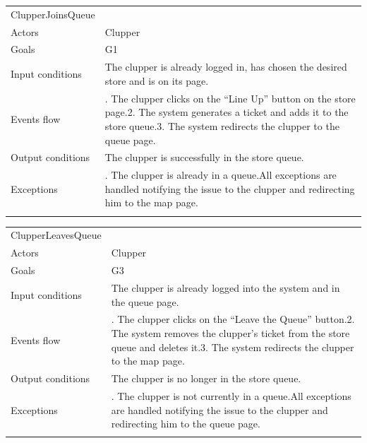 \begin{longtable}[]{@{}
  >{\raggedright\arraybackslash}p{}
  >{\raggedright\arraybackslash}p{}@{}}
\toprule
ClupperJoinsQueue & \\ \addlinespace
\midrule
\endhead
Actors & Clupper \\ \addlinespace
Goals & G1 \\ \addlinespace
Input conditions & The clupper is already logged in, has chosen the
desired store and is on its page. \\ \addlinespace
Events flow & 1. The clupper clicks on the ``Line Up'' button on the
store page.2. The system generates a ticket and adds it to the store
queue.3. The system redirects the clupper to the queue
page. \\ \addlinespace
Output conditions & The clupper is successfully in the store
queue. \\ \addlinespace
Exceptions & 1. The clupper is already in a queue.All exceptions are
handled notifying the issue to the clupper and redirecting him to the
map page. \\ \addlinespace
\bottomrule
\end{longtable}

\begin{longtable}[]{@{}
  >{\raggedright\arraybackslash}p{}
  >{\raggedright\arraybackslash}p{}@{}}
\toprule
ClupperLeavesQueue & \\ \addlinespace
\midrule
\endhead
Actors & Clupper \\ \addlinespace
Goals & G3 \\ \addlinespace
Input conditions & The clupper is already logged into the system and in
the queue page. \\ \addlinespace
Events flow & 1. The clupper clicks on the ``Leave the Queue'' button.2.
The system removes the clupper's ticket from the store queue and deletes
it.3. The system redirects the clupper to the map page. \\ \addlinespace
Output conditions & The clupper is no longer in the store
queue. \\ \addlinespace
Exceptions & 1. The clupper is not currently in a queue.All exceptions
are handled notifying the issue to the clupper and redirecting him to
the queue page. \\ \addlinespace
\bottomrule
\end{longtable}

